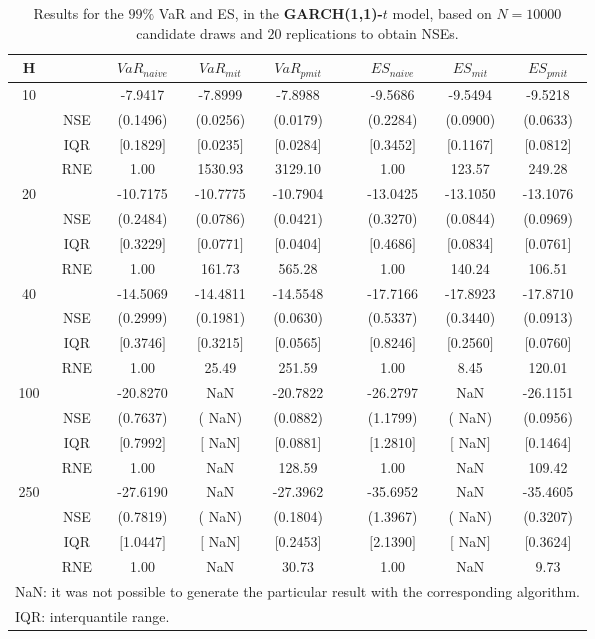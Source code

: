 \footnotesize{  
{ \renewcommand{\arraystretch}{1.3} 
\begin{longtable}{ccccccccc}  
\caption{Results for the $99\%$ VaR and ES, in the \textbf{GARCH(1,1)-$t$} model, based on $N=10000$ candidate draws and $20$ replications to obtain NSEs.} 
\label{tab:res_algos_t_garch2_noS_ML} \\ 
 H & & $VaR_{naive}$ & $VaR_{mit}$ & $VaR_{pmit}$ &  & $ES_{naive}$ & $ES_{mit}$ & $ES_{pmit}$ \\ \hline 
10 & & -7.9417 & -7.8999 & -7.8988 & & -9.5686 & -9.5494 & -9.5218  \\ 
  & NSE & (0.1496) & (0.0256) & (0.0179) & & (0.2284) & (0.0900) & (0.0633)   \\ 
 & IQR & $[$0.1829$]$ & $[$0.0235$]$ & $[$0.0284$]$ & & $[$0.3452$]$ & $[$0.1167$]$ & $[$0.0812$]$  \\  
  & RNE &   1.00 & 1530.93 & 3129.10 & &   1.00 & 123.57 & 249.28   \\ [1ex] 
20 & & -10.7175 & -10.7775 & -10.7904 & & -13.0425 & -13.1050 & -13.1076  \\ 
  & NSE & (0.2484) & (0.0786) & (0.0421) & & (0.3270) & (0.0844) & (0.0969)   \\ 
 & IQR & $[$0.3229$]$ & $[$0.0771$]$ & $[$0.0404$]$ & & $[$0.4686$]$ & $[$0.0834$]$ & $[$0.0761$]$  \\  
  & RNE &   1.00 & 161.73 & 565.28 & &   1.00 & 140.24 & 106.51   \\ [1ex] 
40 & & -14.5069 & -14.4811 & -14.5548 & & -17.7166 & -17.8923 & -17.8710  \\ 
  & NSE & (0.2999) & (0.1981) & (0.0630) & & (0.5337) & (0.3440) & (0.0913)   \\ 
 & IQR & $[$0.3746$]$ & $[$0.3215$]$ & $[$0.0565$]$ & & $[$0.8246$]$ & $[$0.2560$]$ & $[$0.0760$]$  \\  
  & RNE &   1.00 &  25.49 & 251.59 & &   1.00 &   8.45 & 120.01   \\ [1ex] 
100 & & -20.8270 &    NaN & -20.7822 & & -26.2797 &    NaN & -26.1151  \\ 
  & NSE & (0.7637) & (   NaN) & (0.0882) & & (1.1799) & (   NaN) & (0.0956)   \\ 
 & IQR & $[$0.7992$]$ & $[$   NaN$]$ & $[$0.0881$]$ & & $[$1.2810$]$ & $[$   NaN$]$ & $[$0.1464$]$  \\  
  & RNE &   1.00 &    NaN & 128.59 & &   1.00 &    NaN & 109.42   \\ [1ex] 
250 & & -27.6190 &    NaN & -27.3962 & & -35.6952 &    NaN & -35.4605  \\ 
  & NSE & (0.7819) & (   NaN) & (0.1804) & & (1.3967) & (   NaN) & (0.3207)   \\ 
 & IQR & $[$1.0447$]$ & $[$   NaN$]$ & $[$0.2453$]$ & & $[$2.1390$]$ & $[$   NaN$]$ & $[$0.3624$]$  \\  
  & RNE &   1.00 &    NaN &  30.73 & &   1.00 &    NaN &   9.73   \\ [1ex] 
\hline 
  \multicolumn{9}{l}{\footnotesize{NaN: it was not possible to generate the particular result with the corresponding algorithm.}} \\ 
  \multicolumn{9}{l}{\footnotesize{IQR: interquantile range.}} \\ 
\end{longtable} 
} 
} 
